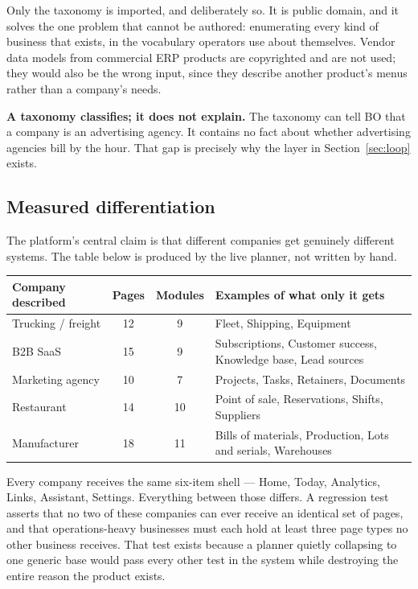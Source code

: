 \documentclass[11pt,a4paper]{article}
\newenvironment{callout}%
{\begin{center}\begin{lrbox}{\calloutbox}\begin{minipage}{\dimexpr0.94\textwidth-24pt\relax}\color{bodark}}%
{\end{minipage}\end{lrbox}\setlength{\fboxsep}{12pt}\colorbox{bosoft}{\usebox{\calloutbox}}\end{center}}
\begin{document}
Only the taxonomy is imported, and deliberately so. It is public domain, and it solves the one
problem that cannot be authored: enumerating every kind of business that exists, in the vocabulary
operators use about themselves. Vendor data models from commercial ERP products are copyrighted and
are not used; they would also be the wrong input, since they describe another product's menus rather
than a company's needs.

\begin{callout}
\textbf{A taxonomy classifies; it does not explain.} The taxonomy can tell BO that a company is an
advertising agency. It contains no fact about whether advertising agencies bill by the hour. That
gap is precisely why the layer in Section~\ref{sec:loop} exists.
\end{callout}

\subsection{Measured differentiation}

The platform's central claim is that different companies get genuinely different systems. The table
below is produced by the live planner, not written by hand.

\begin{center}
\small
\begin{tabular}{@{}l c c p{6.9cm}@{}}
\toprule
\textbf{Company described} & \textbf{Pages} & \textbf{Modules} & \textbf{Examples of what only it gets} \\
\midrule
Trucking / freight & 12 & 9  & Fleet, Shipping, Equipment \\
B2B SaaS           & 15 & 9  & Subscriptions, Customer success, Knowledge base, Lead sources \\
Marketing agency   & 10 & 7  & Projects, Tasks, Retainers, Documents \\
Restaurant         & 14 & 10 & Point of sale, Reservations, Shifts, Suppliers \\
Manufacturer       & 18 & 11 & Bills of materials, Production, Lots and serials, Warehouses \\
\bottomrule
\end{tabular}
\end{center}

Every company receives the same six-item shell --- Home, Today, Analytics, Links, Assistant,
Settings. Everything between those differs. A regression test asserts that no two of these companies
can ever receive an identical set of pages, and that operations-heavy businesses must each hold at
least three page types no other business receives. That test exists because a planner quietly
collapsing to one generic base would pass every other test in the system while destroying the entire
reason the product exists.
\end{document}
